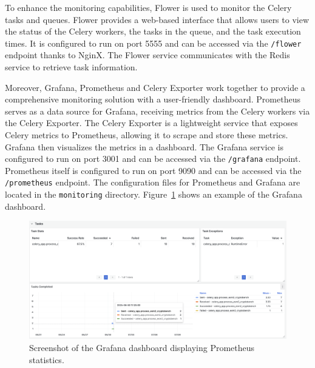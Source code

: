 To enhance the monitoring capabilities, Flower is used to monitor the Celery tasks and queues. Flower provides a web-based interface that allows users to view the status of the Celery workers, the tasks in the queue, and the task execution times. It is configured to run on port 5555 and can be accessed via the \lstinline!/flower! endpoint thanks to NginX. The Flower service communicates with the Redis service to retrieve task information.

Moreover, Grafana, Prometheus and Celery Exporter work together to provide a comprehensive monitoring solution with a user-friendly dashboard. Prometheus serves as a data source for Grafana, receiving metrics from the Celery workers via the Celery Exporter. The Celery Exporter is a lightweight service that exposes Celery metrics to Prometheus, allowing it to scrape and store these metrics. Grafana then visualizes the metrics in a dashboard. The Grafana service is configured to run on port 3001 and can be accessed via the \lstinline!/grafana! endpoint. Prometheus itself is configured to run on port 9090 and can be accessed via the \lstinline!/prometheus! endpoint. The configuration files for Prometheus and Grafana are located in the \lstinline!monitoring! directory. Figure~\ref{fig:grafana} shows an example of the Grafana dashboard.

\begin{figure}[htpb]
    \centering
    \includegraphics[width=\textwidth]{img/grafana.png}
    \caption{Screenshot of the Grafana dashboard displaying Prometheus statistics.}
    \label{fig:grafana}
\end{figure}

